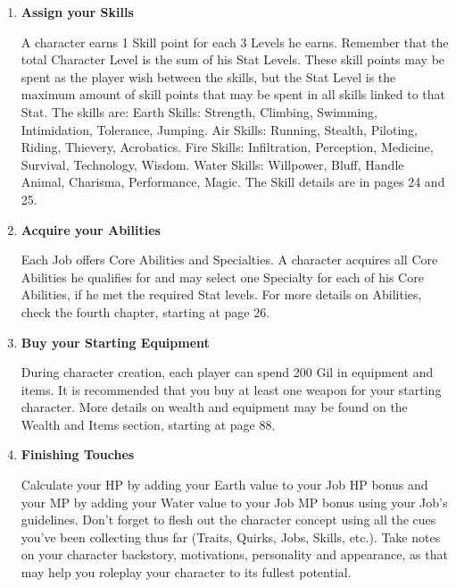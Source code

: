 \begin{multicols}{2}
\begin{enumerate}
\item \textbf{Assign your Skills}

A character earns 1 Skill point for each 3 Levels he
earns. Remember that the total Character Level is
the sum of his Stat Levels. These skill points may
be spent as the player wish between the skills, but
the Stat Level is the maximum amount of skill
points that may be spent in all skills linked to that
Stat. The skills are:
Earth Skills: Strength, Climbing, Swimming,
Intimidation, Tolerance, Jumping.
Air Skills: Running, Stealth, Piloting, Riding,
Thievery, Acrobatics.
Fire Skills: Infiltration, Perception, Medicine,
Survival, Technology, Wisdom.
Water Skills: Willpower, Bluff, Handle Animal,
Charisma, Performance, Magic.
The Skill details are in pages 24 and 25.

\item \textbf{Acquire your Abilities}

Each Job offers Core Abilities and Specialties. A
character acquires all Core Abilities he qualifies for
and may select one Specialty for each of his Core
Abilities, if he met the required Stat levels. For
more details on Abilities, check the fourth chapter,
starting at page 26.

\item \textbf{Buy your Starting Equipment}

During character creation, each player can
spend 200 Gil in equipment and items. It is
recommended that you buy at least one weapon
for your starting character. More details on wealth
and equipment may be found on the Wealth and
Items section, starting at page 88.

\item \textbf{Finishing Touches}

Calculate your HP by adding your Earth value
to your Job HP bonus and your MP by adding your
Water value to your Job MP bonus using your Job's
guidelines. Don't forget to flesh out the character
concept using all the cues you've been collecting
thus far (Traits, Quirks, Jobs, Skills, etc.). Take
notes on your character backstory, motivations,
personality and appearance, as that may help you
roleplay your character to its fullest potential.

\end{enumerate}


\end{multicols}
